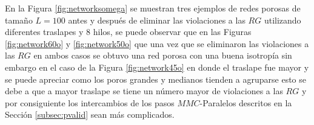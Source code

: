 En la Figura \ref{fig:networksomega} se muestran tres ejemplos de redes porosas de tamaño $L=100$ antes y después de eliminar las violaciones a las $RG$ utilizando diferentes traslapes y 8 hilos, se puede observar que en las Figuras \ref{fig:network60o} y \ref{fig:network50o} que una vez que se eliminaron las violaciones a las $RG$ en ambos casos se obtuvo una red porosa con una buena isotropía sin embargo en el caso de la Figura \ref{fig:network45o} en donde el traslape fue mayor y se puede apreciar como los poros grandes y medianos tienden a agruparse esto se debe a que a mayor traslape se tiene un número mayor de violaciones a las $RG$ y por consiguiente los intercambios de los pasos $MMC$-Paralelos descritos en la Sección \ref{subsec:pvalid}  sean más complicados.\\


\begingroup
\setlength{\parindent}{0cm}
